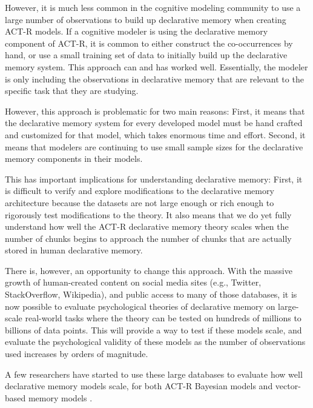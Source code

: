 \documentclass[man,donotrepeattitle]{apa6}
\begin{document}
However, it is much less common in the cognitive modeling community to use a large number of observations to build up declarative memory when creating ACT-R models.
If a cognitive modeler is using the declarative memory component of ACT-R,
it is common to either construct the co-occurrences by hand, or use a small training set of data to initially build up the declarative memory system.
This approach can and has worked well.
Essentially, the modeler is only including the observations in declarative memory that are relevant to the specific task that they are studying.

However, this approach is problematic for two main reasons:
First, it means that the declarative memory system for every developed model must be hand crafted and customized for that model, which takes enormous time and effort.
Second, it means that modelers are continuing to use small sample sizes for the declarative memory components in their models.

This has important implications for understanding declarative memory:
First, it is difficult to verify and explore modifications to the declarative memory architecture because the datasets are not large enough or rich enough to rigorously test modifications to the theory.
It also means that we do yet fully understand how well the ACT-R declarative memory theory scales when the number of chunks begins to approach the number of chunks that are actually stored in human declarative memory.

There is, however, an opportunity to change this approach.
With the massive growth of human-created content on social media sites (e.g., Twitter, StackOverflow, Wikipedia), and public access to many of those databases,
it is now possible to evaluate psychological theories of declarative memory on large-scale real-world tasks where the theory can be tested on hundreds of millions to billions of data points.
This will provide a way to test if these models scale, and evaluate the psychological validity of these models as the number of observations used increases by orders of magnitude.

A few researchers have started to use these large databases to evaluate how well declarative memory models scale,
for both ACT-R Bayesian models \parencites{Fu2007,Pirolli2003,Stanley2013,Douglass2010} and vector-based memory models \parencites{Jones2007,Rutledge2008,Recchia2010,Sahlgren2008}.
\end{document}
